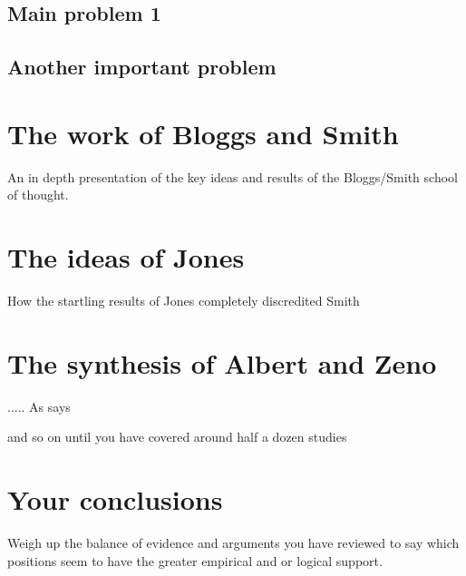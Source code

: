 \documentclass[a4paper,portrait,12pt]{article}
\begin{document}
   \subsection{Main problem 1}
   \subsection{Another important problem}
 \section{The work of Bloggs and Smith}
 
  An in depth presentation of the key ideas and results of the Bloggs/Smith
  school of thought\citep{SYMBOL}. 
 \section{The ideas of Jones}
 
 How the startling results of Jones\citep{Hayes89} completely discredited Smith
 
 \section{The synthesis of  Albert and Zeno}
 ..... As \citet{Einstein} says
 
 and so on until you have covered around half a dozen studies
 \section{Your conclusions}

Weigh up the balance of evidence and arguments you have reviewed to say which
positions seem to have the greater empirical and or logical support.



\end{document}
